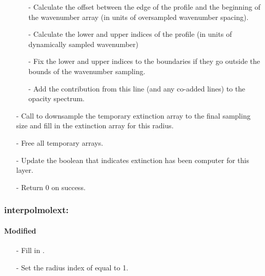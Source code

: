 \documentclass[letterpaper,12pt]{article}
\begin{document}
\begin{enumerate}[leftmargin=10pt, noitemsep, parsep=0pt, topsep=0ex]
\begin{enumerate}[leftmargin=10pt, noitemsep, parsep=0pt, topsep=0ex]
\item[-] Calculate the offset between the edge of the profile and the beginning of the wavenumber array (in units of oversampled wavenumber spacing).
\item[-] Calculate the lower and upper indices of the profile (in units of dynamically sampled wavenumber)
\item[-] Fix the lower and upper indices to the boundaries if they go outside the bounds of the wavenumber sampling.
\item[-] Add the contribution from this line (and any co-added lines) to the opacity spectrum.
\end{enumerate}
\item[-] Call  to downsample the temporary extinction array to the final sampling size and fill in the extinction array for this radius.
\item[-] Free all temporary arrays.
\item[-] Update the boolean that indicates extinction has been computer for this layer.
\item[-] Return 0 on success.
\end{enumerate}


\subsubsection{interpolmolext:}
\paragraph{Modified}
\begin{enumerate}[leftmargin=10pt, noitemsep, parsep=0pt, topsep=0ex]
\item[-] Fill in . 
\item[-] Set the radius index of  equal to 1.
\end{enumerate}
\end{document}

